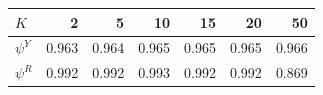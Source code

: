 \begin{tabular}{lrrrrrr}
\toprule
$K$ & 2 & 5 & 10 & 15 & 20 & 50 \\
\midrule
$\psi^Y$ & 0.963 & 0.964 & 0.965 & 0.965 & 0.965 & 0.966 \\
$\psi^R$ & 0.992 & 0.992 & 0.993 & 0.992 & 0.992 & 0.869 \\
\bottomrule
\end{tabular}
